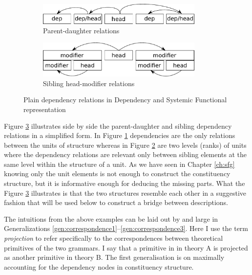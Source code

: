 \begin{figure}[hbtp]
    \centering
    \begin{subfigure}{.5\textwidth}
        \centering
        \includegraphics[width=0.9\textwidth]{Figures/SFL-grammar/dependency-dg.pdf}
        \vspace{+22pt}
        \caption{Parent-daughter relations}
        \label{fig:dependency-dg}
    \end{subfigure}%
    \begin{subfigure}{.5\textwidth}
        \centering
        \includegraphics[width=0.9\textwidth]{Figures/SFL-grammar/dependency-sfg.pdf}
        \caption{Sibling head-modifier relations}
        \label{fig:dependency-sfg}
    \end{subfigure}
    \caption{Plain dependency relations in Dependency and Systemic Functional representation}
    \label{fig:dependency-relations}
\end{figure}

Figure \ref{fig:dependency-relations} illustrates side by side the parent-daughter and sibling dependency relations in a simplified form. In Figure \ref{fig:dependency-dg} dependencies are the only relations between the units of structure whereas in Figure \ref{fig:dependency-sfg} are two levels (ranks) of units where the dependency relations are relevant only between sibling elements at the same level within the structure of a unit. As we have seen in Chapter \ref{ch:sfg} knowing only the unit elements is not enough to construct the constituency structure, but it is informative enough for deducing the missing parts. What the Figure \ref{fig:dependency-relations} illustrates is that the two structures resemble each other in a suggestive fashion that will be used below to construct a bridge between descriptions.  


The intuitions from the above examples can be laid out by and large in Generalizations \ref{gen:correspondence1}--\ref{gen:correspondence3}. Here I use the term \textit{projection} to refer specifically to the correspondences between theoretical primitives of the two grammars. I say that a primitive in in theory A is projected as another primitive in theory B. The first generalisation is on maximally accounting for the dependency nodes in constituency structure.

